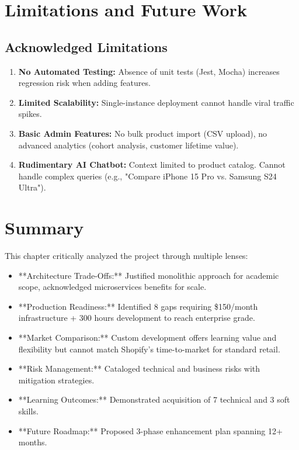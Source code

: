 \documentclass[12pt, a4paper]{report}
\begin{document}
{{\section{Limitations and Future Work}

\subsection{Acknowledged Limitations}

\begin{enumerate}
    \item \textbf{No Automated Testing:} Absence of unit tests (Jest, Mocha) increases regression risk when adding features.
    \item \textbf{Limited Scalability:} Single-instance deployment cannot handle viral traffic spikes.
    \item \textbf{Basic Admin Features:} No bulk product import (CSV upload), no advanced analytics (cohort analysis, customer lifetime value).
    \item \textbf{Rudimentary AI Chatbot:} Context limited to product catalog. Cannot handle complex queries (e.g., "Compare iPhone 15 Pro vs. Samsung S24 Ultra").
\end{enumerate}



\section{Summary}

This chapter critically analyzed the project through multiple lenses:

\begin{itemize}
    \item **Architecture Trade-Offs:** Justified monolithic approach for academic scope, acknowledged microservices benefits for scale.
    \item **Production Readiness:** Identified 8 gaps requiring \$150/month infrastructure + 300 hours development to reach enterprise grade.
    \item **Market Comparison:** Custom development offers learning value and flexibility but cannot match Shopify's time-to-market for standard retail.
    \item **Risk Management:** Cataloged technical and business risks with mitigation strategies.
    \item **Learning Outcomes:** Demonstrated acquisition of 7 technical and 3 soft skills.
    \item **Future Roadmap:** Proposed 3-phase enhancement plan spanning 12+ months.
\end{itemize}

}}
\end{document}
